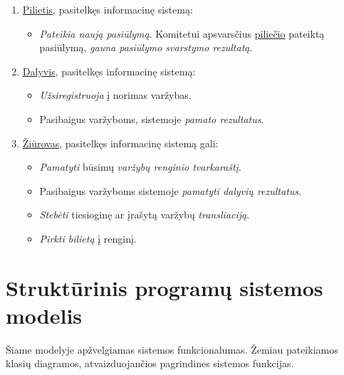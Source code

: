\documentclass{VUMIFPSkursinis}
\begin{document}
		\begin{enumerate}
			\item \underline{Pilietis}, pasitelkęs informacinę sistemą:
			\begin{itemize}
				\item \textit{Pateikia naują pasiūlymą}. Komitetui apsvarsčius \underline{piliečio} pateiktą pasiūlymą, \textit{gauna pasiūlymo svarstymo rezultatą}.
			\end{itemize}
			\item \underline{Dalyvis}, pasitelkęs informacinę sistemą:
			\begin{itemize}
				\item \textit{Užsiregistruoja} į norimas varžybas.
				\item Pasibaigus varžyboms, sistemoje \textit{pamato rezultatus}.
			\end{itemize}
			\item \underline{Žiūrovas}, pasitelkęs informacinę sistemą gali:
			\begin{itemize}
				\item \textit{Pamatyti} būsimų \textit{varžybų renginio tvarkaraštį}.
				\item Pasibaigus varžyboms sistemoje \textit{pamatyti dalyvių rezultatus}.
				\item \textit{Stebėti} tiesioginę ar įrašytą varžybų \textit{transliaciją}.
				\item \textit{Pirkti bilietą} į renginį.
			\end{itemize}
		\end{enumerate}
		
    \section{Struktūrinis programų sistemos modelis} \label{strukturinisPSModelis}
        Šiame modelyje apžvelgiamas sistemos funkcionalumas.
		Žemiau pateikiamos klasių diagramos, atvaizduojančios pagrindines sistemos funkcijas.
		
\end{document}
